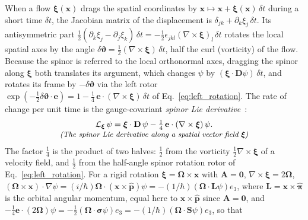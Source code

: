 \documentclass[aps,prd,onecolumn,tightenlines,nofootinbib,notitlepage,11pt,floatfix]{revtex4-2}
\theoremstyle{indentedtheorem}
\begin{document}
When a flow $\boldsymbol{\xi}(\mathbf{x})$ drags the spatial coordinates by $\mathbf{x}\mapsto\mathbf{x}+\boldsymbol{\xi}(\mathbf{x})\,\delta t$ during a short time $\delta t$, the Jacobian matrix of the displacement is $\delta_{jk}+\partial_k\xi_j\,\delta t$. Its antisymmetric part $\tfrac{1}{2}(\partial_k\xi_j-\partial_j\xi_k)\,\delta t = -\tfrac{1}{2}\epsilon_{jkl}(\nabla\times\boldsymbol{\xi})_l\,\delta t$ rotates the local spatial axes by the angle $\delta\boldsymbol{\vartheta} = \tfrac{1}{2}(\nabla\times\boldsymbol{\xi})\,\delta t$, half the curl (vorticity) of the flow. Because the spinor is referred to the local orthonormal axes, dragging the spinor along $\boldsymbol{\xi}$ both translates its argument, which changes $\psi$ by $(\boldsymbol{\xi}\cdot\mathbf{D}\psi)\,\delta t$, and rotates its frame by $-\delta\boldsymbol{\vartheta}$ via the left rotor $\exp(-\tfrac{1}{2}\delta\boldsymbol{\vartheta}\cdot\mathbf{e}) = 1 - \tfrac{1}{4}\,\mathbf{e}\cdot(\nabla\times\boldsymbol{\xi})\,\delta t$ of Eq.~\eqref{eq:left_rotation}. The rate of change per unit time is the gauge-covariant \emph{spinor Lie derivative}~\citep{Kosmann1971Derivees,ObukhovSilenkoTeryaev2011Dirac}:
\begin{equation}
    \begin{gathered}
    \mathcal{L}_{\boldsymbol{\xi}}\,\psi = \boldsymbol{\xi}\cdot\mathbf{D}\,\psi - \tfrac{1}{4}\,\mathbf{e}\cdot(\nabla\times\boldsymbol{\xi})\,\psi . \\[-3pt]
    \text{\small\itshape (The spinor Lie derivative along a spatial vector field $\boldsymbol{\xi}$)}
    \end{gathered}
    \label{eq:spinor_lie}
\end{equation}
The factor $\tfrac{1}{4}$ is the product of two halves: $\tfrac{1}{2}$ from the vorticity $\tfrac{1}{2}\nabla\times\boldsymbol{\xi}$ of a velocity field, and $\tfrac{1}{2}$ from the half-angle spinor rotation rotor of Eq.~\eqref{eq:left_rotation}. For a rigid rotation $\boldsymbol{\xi} = \boldsymbol{\Omega}\times\mathbf{x}$ with $\mathbf{A}=\mathbf{0}$, $\nabla\times\boldsymbol{\xi} = 2\boldsymbol{\Omega}$, $(\boldsymbol{\Omega}\times\mathbf{x})\cdot\nabla\psi = (i/\hbar)\boldsymbol{\Omega}\cdot(\mathbf{x}\times\hat{\mathbf{p}})\psi = -(1/\hbar)(\boldsymbol{\Omega}\cdot\mathbf{L}\psi)e_3$, where $\mathbf{L}=\mathbf{x}\times\hat{\boldsymbol{\pi}}$ is the orbital angular momentum, equal here to $\mathbf{x}\times\hat{\mathbf{p}}$ since $\mathbf{A}=\mathbf{0}$, and $-\tfrac{1}{4}\mathbf{e}\cdot(2\boldsymbol{\Omega})\psi = -\tfrac{1}{2}(\boldsymbol{\Omega}\cdot\boldsymbol{\sigma}\psi)e_3 = -(1/\hbar)(\boldsymbol{\Omega}\cdot\mathbf{S}\psi)e_3$, so that
\end{document}
